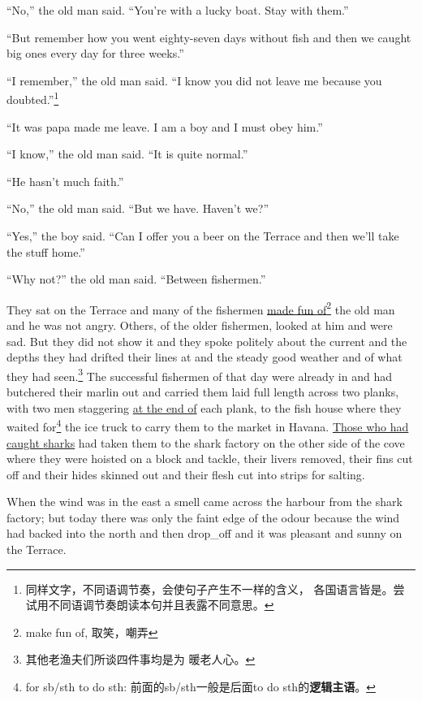 ``No,'' the old man said. ``You're with a lucky boat. Stay with them.''

``But remember how you went eighty-seven days without fish and then we caught big ones every day for three weeks.''

``I remember,'' the old man said. ``I know you did not leave me because you
\gls{doubted}.''\footnote{同样文字，不同语调节奏，会使句子产生不一样的含义，
  各国语言皆是。尝试用不同语调节奏朗读本句并且表露不同意思。}

``It was papa made me leave. I am a boy and I must \gls{obey} him.''

``I know,'' the old man said. ``It is quite normal.''

``He hasn't much \gls{faith}.''

``No,'' the old man said. ``But we have. Haven't we?''

``Yes,'' the boy said. ``Can I offer you a beer on the \gls{Terrace} and then we'll take the \gls{stuff} home.''

``Why not?'' the old man said. ``Between fishermen.''

They sat on the Terrace and many of the fishermen \uline{made fun
  of}\footnote{make fun of, 取笑，嘲弄} the old man and he was not angry.
Others, of the older fishermen, looked at him and were sad. But they did not
show it and they spoke \gls{politely} about the \gls{current} and the
\glspl{depth} they had \gls{drifted} their lines at and the \gls{steady}
good weather and of what they had seen.\footnote{其他老渔夫们所谈四件事均是为
  暖老人心。} The successful fishermen of that day were already in and had
\gls{butchered} their \gls{marlin} out and carried them \gls{laid} full
length across two \glspl{plank}, with two men \gls{staggering} \uline{at the
  end of} each plank, to the fish house where they waited for\footnote{for
  sb/sth to do sth: 前面的sb/sth一般是后面to do sth的\textbf{逻辑主语}。} the
ice truck to carry them to the market in Havana. \uline{Those who had caught
  \glspl{shark}} had taken them to the shark factory on the other side of
the \gls{cove} where they were \gls{hoisted} on a \gls{block} and
\gls{tackle}, their \glspl{liver} removed, their \glspl{fin} cut off and
their \glspl{hide} \gls{skinned} out and their \gls{flesh} cut into
\glspl{strip} for salting.

When the wind was in the east a smell came across the \gls{harbour} from the
shark factory; but today there was only the \gls{faint} \gls{edge} of the
\gls{odour} because the wind had backed into the north and then \gls{drop_off}
and it was \gls{pleasant} and sunny on the Terrace.

